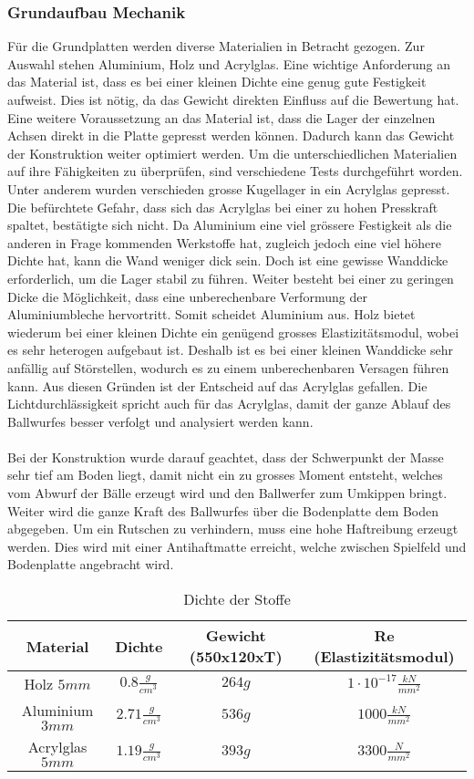 \subsubsection{Grundaufbau Mechanik}
Für die Grundplatten werden diverse Materialien in Betracht gezogen. Zur Auswahl stehen Aluminium,
Holz und Acrylglas. Eine wichtige Anforderung an das Material ist, dass es bei einer kleinen Dichte
eine genug gute Festigkeit aufweist. Dies ist nötig, da das Gewicht direkten Einfluss auf die
Bewertung hat. Eine weitere Voraussetzung an das Material ist, dass die Lager der einzelnen Achsen
direkt in die Platte gepresst werden können. Dadurch kann das Gewicht der Konstruktion weiter
optimiert werden. Um die unterschiedlichen Materialien auf ihre Fähigkeiten zu überprüfen, sind
verschiedene Tests durchgeführt worden. Unter anderem wurden verschieden grosse Kugellager
in ein Acrylglas gepresst. Die befürchtete Gefahr, dass sich das Acrylglas bei einer zu hohen
Presskraft spaltet, bestätigte sich nicht. Da Aluminium eine viel grössere Festigkeit als die
anderen in Frage kommenden Werkstoffe hat, zugleich jedoch eine viel höhere Dichte hat, kann die
Wand weniger dick sein. Doch ist eine gewisse Wanddicke erforderlich, um die Lager stabil zu führen.
Weiter besteht bei einer zu geringen Dicke die Möglichkeit, dass eine unberechenbare Verformung der
Aluminiumbleche hervortritt. Somit scheidet Aluminium aus. Holz bietet wiederum bei einer kleinen
Dichte ein genügend grosses Elastizitätsmodul, wobei es sehr heterogen aufgebaut ist. Deshalb ist es
bei einer kleinen Wanddicke sehr anfällig auf Störstellen, wodurch es zu einem unberechenbaren
Versagen führen kann. Aus diesen Gründen ist der Entscheid auf das Acrylglas gefallen. Die
Lichtdurchlässigkeit spricht auch für das Acrylglas, damit der ganze Ablauf des Ballwurfes besser
verfolgt und analysiert werden kann.\\
\\
Bei der Konstruktion wurde darauf geachtet, dass der Schwerpunkt der Masse sehr tief am Boden liegt,
damit nicht ein zu grosses Moment entsteht, welches vom Abwurf der Bälle erzeugt wird und den
Ballwerfer zum Umkippen bringt. Weiter wird die ganze Kraft des Ballwurfes über die Bodenplatte dem
Boden abgegeben. Um ein Rutschen zu verhindern, muss eine hohe Haftreibung erzeugt werden. Dies wird
mit einer Antihaftmatte erreicht, welche zwischen Spielfeld und Bodenplatte angebracht wird.
\begin{table}[h!]
	\begin{tabular}{cccc}
		Material & Dichte & Gewicht (550x120xT) & Re (Elastizitätsmodul) \\ 
		\hline \rule{0pt}{11pt}Holz $5 mm$ & $0.8 \frac{g}{cm^3}$ & $264 g$ & $1 \cdot 10^{-17} \frac{kN}{mm^2}$ \\ 
		\rule{0pt}{11pt}Aluminium $3 mm$ & $2.71 \frac{g}{cm^3}$ & $536 g$ & $1000 \frac{kN}{mm^2}$ \\ 
		\rule{0pt}{11pt}Acrylglas $5 mm$ & $1.19 \frac{g}{cm^3}$ & $393 g$ & $3300 \frac{N}{mm^2}$  \\ 
	\end{tabular} 
	\caption[Dichte der Stoffe]{Dichte der Stoffe \cite{M:Chemie}}
	\centering
\end{table}